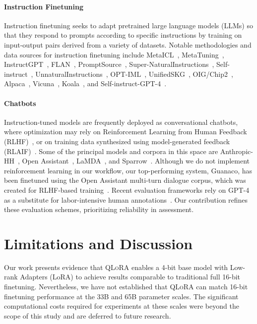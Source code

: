 \paragraph{Instruction Finetuning} Instruction finetuning seeks to adapt pretrained large language models (LLMs) so that they respond to prompts according to specific instructions by training on input-output pairs derived from a variety of datasets. Notable methodologies and data sources for instruction finetuning include MetaICL~\citep{min2021metaicl}, MetaTuning~\citep{zhong2021adapting}, InstructGPT~\citep{ouyang2022training}, FLAN~\citep{wei2021finetuned,chung2022scaling}, PromptSource~\citep{bach2022promptsource}, Super-NaturalInstructions~\citep{wang2022super,sanh2021multitask}, Self-instruct~\citep{wang2022self}, UnnaturalInstructions~\citep{honovich2022unnatural}, OPT-IML~\citep{iyer2022opt}, UnifiedSKG~\citep{xie2022unifiedskg}, OIG/Chip2~\citep{laion2023}, Alpaca~\citep{alpaca}, Vicuna~\citep{vicuna2023}, Koala~\citep{koala_blogpost_2023}, and Self-instruct-GPT-4~\citep{peng2023instruction}.

\paragraph{Chatbots} Instruction-tuned models are frequently deployed as conversational chatbots, where optimization may rely on Reinforcement Learning from Human Feedback (RLHF)~\citep{christiano2017deep}, or on training data synthesized using model-generated feedback (RLAIF)~\citep{bai2022constitutional}. Some of the principal models and corpora in this space are Anthropic-HH~\citep{askell2021general,bai2022training}, Open Assistant~\citep{kopf2023openassistant}, LaMDA~\citep{thoppilan2022lamda}, and Sparrow~\citep{glaese2022improving}. Although we do not implement reinforcement learning in our workflow, our top-performing system, Guanaco, has been finetuned using the Open Assistant multi-turn dialogue corpus, which was created for RLHF-based training~\citep{kopf2023openassistant}. Recent evaluation frameworks rely on GPT-4 as a substitute for labor-intensive human annotations~\citep{vicuna2023,peng2023instruction}. Our contribution refines these evaluation schemes, prioritizing reliability in assessment.

\section{Limitations and Discussion}

Our work presents evidence that \textsc{QLoRA} enables a 4-bit base model with Low-rank Adapters (LoRA) to achieve results comparable to traditional full 16-bit finetuning. Nevertheless, we have not established that \textsc{QLoRA} can match 16-bit finetuning performance at the 33B and 65B parameter scales. The significant computational costs required for experiments at these scales were beyond the scope of this study and are deferred to future research.

